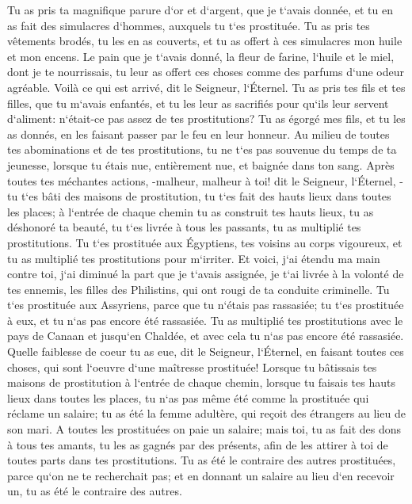 \verse Tu as pris ta magnifique parure d`or et d`argent, que je t`avais donnée, et tu en as fait des simulacres d`hommes, auxquels tu t`es prostituée. 
\verse Tu as pris tes vêtements brodés, tu les en as couverts, et tu as offert à ces simulacres mon huile et mon encens. 
\verse Le pain que je t`avais donné, la fleur de farine, l`huile et le miel, dont je te nourrissais, tu leur as offert ces choses comme des parfums d`une odeur agréable. Voilà ce qui est arrivé, dit le Seigneur, l`Éternel. 
\verse Tu as pris tes fils et tes filles, que tu m`avais enfantés, et tu les leur as sacrifiés pour qu`ils leur servent d`aliment: n`était-ce pas assez de tes prostitutions? 
\verse Tu as égorgé mes fils, et tu les as donnés, en les faisant passer par le feu en leur honneur. 
\verse Au milieu de toutes tes abominations et de tes prostitutions, tu ne t`es pas souvenue du temps de ta jeunesse, lorsque tu étais nue, entièrement nue, et baignée dans ton sang. 
\verse Après toutes tes méchantes actions, -malheur, malheur à toi! dit le Seigneur, l`Éternel, - 
\verse tu t`es bâti des maisons de prostitution, tu t`es fait des hauts lieux dans toutes les places; 
\verse à l`entrée de chaque chemin tu as construit tes hauts lieux, tu as déshonoré ta beauté, tu t`es livrée à tous les passants, tu as multiplié tes prostitutions. 
\verse Tu t`es prostituée aux Égyptiens, tes voisins au corps vigoureux, et tu as multiplié tes prostitutions pour m`irriter. 
\verse Et voici, j`ai étendu ma main contre toi, j`ai diminué la part que je t`avais assignée, je t`ai livrée à la volonté de tes ennemis, les filles des Philistins, qui ont rougi de ta conduite criminelle. 
\verse Tu t`es prostituée aux Assyriens, parce que tu n`étais pas rassasiée; tu t`es prostituée à eux, et tu n`as pas encore été rassasiée. 
\verse Tu as multiplié tes prostitutions avec le pays de Canaan et jusqu`en Chaldée, et avec cela tu n`as pas encore été rassasiée. 
\verse Quelle faiblesse de coeur tu as eue, dit le Seigneur, l`Éternel, en faisant toutes ces choses, qui sont l`oeuvre d`une maîtresse prostituée! 
\verse Lorsque tu bâtissais tes maisons de prostitution à l`entrée de chaque chemin, lorsque tu faisais tes hauts lieux dans toutes les places, tu n`as pas même été comme la prostituée qui réclame un salaire; 
\verse tu as été la femme adultère, qui reçoit des étrangers au lieu de son mari. 
\verse A toutes les prostituées on paie un salaire; mais toi, tu as fait des dons à tous tes amants, tu les as gagnés par des présents, afin de les attirer à toi de toutes parts dans tes prostitutions. 
\verse Tu as été le contraire des autres prostituées, parce qu`on ne te recherchait pas; et en donnant un salaire au lieu d`en recevoir un, tu as été le contraire des autres. 
